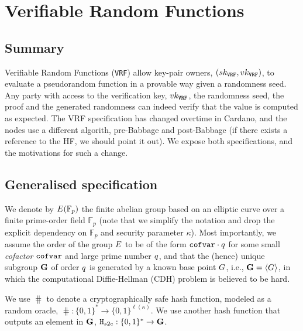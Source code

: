 \section{Verifiable Random Functions}
\label{sec:vrf}
\subsection{Summary}
\newcommand{\sk}{sk}
\newcommand{\vrf}{\texttt{VRF}\xspace}
\newcommand{\vrfsk}{\sk_{\vrf}}
\newcommand{\vrfvk}{\vk_{\vrf}}
\newcommand{\vrfoutput}{\beta}
\newcommand{\vrfproof}{\Pi}
\newcommand{\vrfkeygen}{\texttt{VrfKeyGen}}
\newcommand{\vrfgenerateproof}{\texttt{GenerateProof}}
\newcommand{\parallelsep}{\;||\;}
\newcommand{\true}{\texttt{true}}
\newcommand{\false}{\texttt{false}}


Verifiable Random Functions (\vrf) allow key-pair owners, $(\vrfsk, \vrfvk)$,
to evaluate a pseudorandom function in a provable way given a randomness seed.
Any party with access to the verification key, $\vrfvk$, the
randomness seed, the proof and the generated randomness can indeed verify
that the value is computed as expected. The VRF specification has changed
overtime in Cardano, and the nodes use a different algorith, pre-Babbage and
post-Babbage (if there exists a reference to the HF, we should point it out).
We expose both specifications, and the motivations for such a change.
\subsection{Generalised specification}
We denote by $E(\mathbb{F}_p)$ the finite abelian group based on an elliptic curve over a finite prime-order field $\mathbb{F}_p$ (note that we simplify the notation and drop the explicit dependency on $\mathbb{F}_p$ and security parameter $\kappa$). Most importantly, we assume the order of the group $E$ to be of the form $\texttt{cofvar}\cdot q$ for some small \emph{cofactor} $\texttt{cofvar}$ and large prime number $q$, and that the (hence) unique subgroup $\mathbf{G}$ of order $q$ is generated by a known base point $G$, i.e., $\mathbf{G} = \langle G\rangle$,  in which the computational Diffie-Hellman (CDH) problem is believed to be hard.

We use $\hash$ to denote a cryptographically safe hash function, modeled as a random oracle, $\hash: \{0,1\}^*\rightarrow\{0,1\}^{\ell(\kappa)}$. We use another hash function that outputs an element in $\mathbf{G}$, $\texttt{H}_{s2c}: \{0,1\}^* \to \mathbf{G}$.

